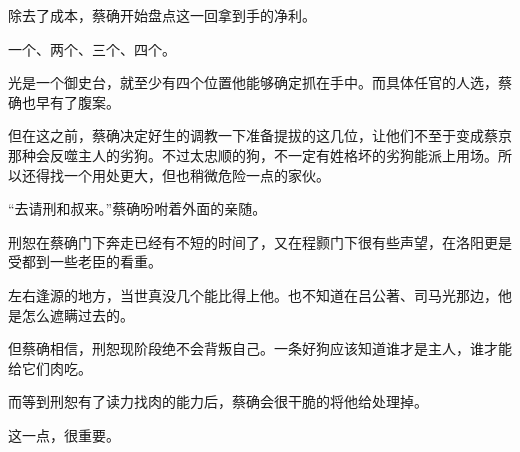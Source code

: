 除去了成本，蔡确开始盘点这一回拿到手的净利。

一个、两个、三个、四个。

光是一个御史台，就至少有四个位置他能够确定抓在手中。而具体任官的人选，蔡确也早有了腹案。

但在这之前，蔡确决定好生的调教一下准备提拔的这几位，让他们不至于变成蔡京那种会反噬主人的劣狗。不过太忠顺的狗，不一定有姓格坏的劣狗能派上用场。所以还得找一个用处更大，但也稍微危险一点的家伙。

“去请刑和叔来。”蔡确吩咐着外面的亲随。

刑恕在蔡确门下奔走已经有不短的时间了，又在程颢门下很有些声望，在洛阳更是受都到一些老臣的看重。

左右逢源的地方，当世真没几个能比得上他。也不知道在吕公著、司马光那边，他是怎么遮瞒过去的。

但蔡确相信，刑恕现阶段绝不会背叛自己。一条好狗应该知道谁才是主人，谁才能给它们肉吃。

而等到刑恕有了读力找肉的能力后，蔡确会很干脆的将他给处理掉。

这一点，很重要。

